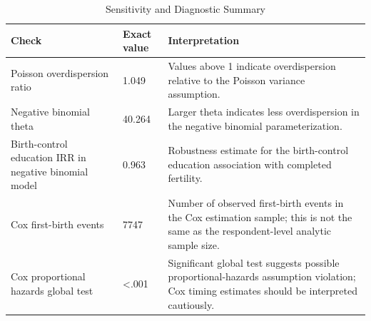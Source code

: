 \begin{table}

\caption{Sensitivity and Diagnostic Summary}
\centering
\begin{tabular}[t]{lll}
\toprule
Check & Exact value & Interpretation\\
\midrule
Poisson overdispersion ratio & 1.049 & Values above 1 indicate overdispersion relative to the Poisson variance assumption.\\
Negative binomial theta & 40.264 & Larger theta indicates less overdispersion in the negative binomial parameterization.\\
Birth-control education IRR in negative binomial model & 0.963 & Robustness estimate for the birth-control education association with completed fertility.\\
Cox first-birth events & 7747 & Number of observed first-birth events in the Cox estimation sample; this is not the same as the respondent-level analytic sample size.\\
Cox proportional hazards global test & \textless{}.001 & Significant global test suggests possible proportional-hazards assumption violation; Cox timing estimates should be interpreted cautiously.\\
\bottomrule
\end{tabular}
\end{table}